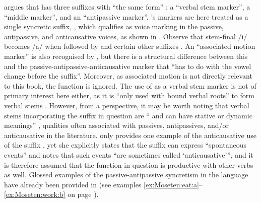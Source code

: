 \cite[236, 306ff.]{sakel:2004} argues that  has three suffixes with “the same form” : a “verbal stem marker”, a “middle marker”, and an “antipassive marker”. \citeauthor{sakel:2004}’s markers are here treated as a single syncretic suffix, , which qualifies as voice marking in the passive, antipassive, and anticausative voices, as shown in . Observe that stem-final /i/ becomes /a/ when followed by  and certain other suffixes \citep[47, 308]{sakel:2004}. An “associated motion marker”  is also recognised by \cite[273]{sakel:2004}, but there is a structural difference between this and the passive-antipassive-anticausative marker  that “has to do with the vowel change before the suffix”. Moreover, as associated motion is not directly relevant to this book, the function is ignored. The use of  as a verbal stem marker is not of primary interest here either, as it is “only used with bound verbal roots” to form verbal stems \citep[218, 236]{sakel:2004}. However, from a  perspective, it may be worth noting that verbal stems incorporating the suffix in question are “ and can have stative or dynamic meanings” \citep[236]{sakel:2004}, qualities often associated with passives, antipassives, and/or anticausative in the literature. \cite[307, 479]{sakel:2004} only provides one example of the anticausative use of the suffix , yet she explicitly states that the suffix can express “spontaneous events” and notes that such events “are sometimes called ‘anticausative’”, and it is therefore assumed that the function in question is productive with other verbs as well. Glossed examples of the passive-antipassive syncretism in the language have already been provided in  (see examples \ref{ex:Moseten:eat:a}--\ref{ex:Moseten:work:b} on page \pageref{ex:Moseten:eat:a}).

